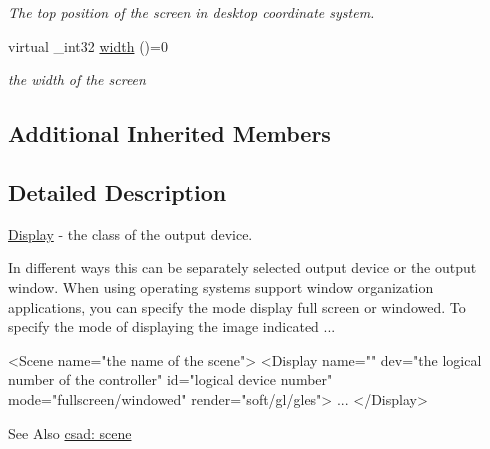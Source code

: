 \begin{DoxyCompactItemize}
\begin{DoxyCompactList}\small\item\em The top position of the screen in desktop coordinate system. \end{DoxyCompactList}\item 
\hypertarget{classcsad_1_1_display_a8c58cdfa8d73d88cfd46043cc0433218}{virtual \-\_\-int32 \hyperlink{classcsad_1_1_display_a8c58cdfa8d73d88cfd46043cc0433218}{width} ()=0}\label{classcsad_1_1_display_a8c58cdfa8d73d88cfd46043cc0433218}

\begin{DoxyCompactList}\small\item\em the width of the screen \end{DoxyCompactList}\end{DoxyCompactItemize}
\subsection*{Additional Inherited Members}


\subsection{Detailed Description}
\hyperlink{classcsad_1_1_display}{Display} -\/ the class of the output device. 

In different ways this can be separately selected output device or the output window. When using operating systems support window organization applications, you can specify the mode display full screen or windowed. To specify the mode of displaying the image indicated ...

\begin{DoxyVerb}  <Scene name="the name of the scene">
  <Display name="" dev="the logical number of the controller" id="logical device number" mode="fullscreen/windowed" render="soft/gl/gles">
      ...
  </Display>
\end{DoxyVerb}


\begin{DoxySeeAlso}{See Also}
\hyperlink{group__scene}{csad\-: scene} 
\end{DoxySeeAlso}
